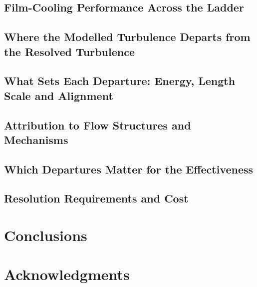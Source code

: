 \documentclass[colorlinks,upint,subscriptcorrection,varvw,hyphenate,balance,lineno]{asmeconf}
\begin{document}
\subsection{Film-Cooling Performance Across the Ladder}\label{sec:performance}
\subsection{Where the Modelled Turbulence Departs from the Resolved Turbulence}\label{sec:departures}
\subsection{What Sets Each Departure: Energy, Length Scale and Alignment}\label{sec:causes}
\subsection{Attribution to Flow Structures and Mechanisms}\label{sec:mechanisms}
\subsection{Which Departures Matter for the Effectiveness}\label{sec:effectiveness}
\subsection{Resolution Requirements and Cost}\label{sec:cost}

\section{Conclusions}\label{sec:conclusions}

\section*{Acknowledgments}


\end{document}
